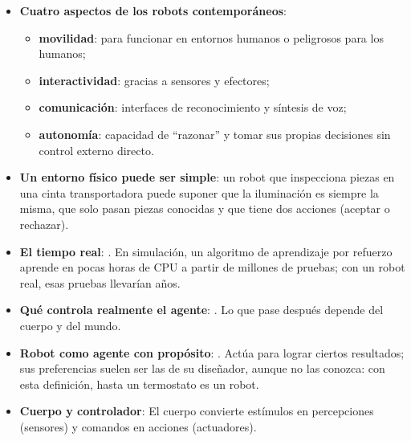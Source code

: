 \documentclass[11pt,a4paper]{article}
\begin{document}
\begin{extras}
\begin{itemize}
  \item \textbf{Cuatro aspectos de los robots contemporáneos}:
  \begin{itemize}
    \item \textbf{movilidad}: para funcionar en entornos humanos o peligrosos para los humanos;
    \item \textbf{interactividad}: gracias a sensores y efectores;
    \item \textbf{comunicación}: interfaces de reconocimiento y síntesis de voz;
    \item \textbf{autonomía}: capacidad de ``razonar'' y tomar sus propias decisiones sin control externo directo.
  \end{itemize}
  \item \textbf{Un entorno físico puede ser simple}: un robot que inspecciona piezas en una cinta transportadora puede suponer que la iluminación es siempre la misma, que solo pasan piezas conocidas y que tiene dos acciones (aceptar o rechazar).
  \item \textbf{El tiempo real}: . En simulación, un algoritmo de aprendizaje por refuerzo aprende en pocas horas de CPU a partir de millones de pruebas; con un robot real, esas pruebas llevarían años.
  \item \textbf{Qué controla realmente el agente}: . Lo que pase después depende del cuerpo y del mundo.
  \item \textbf{Robot como agente con propósito}: . Actúa para lograr ciertos resultados; sus preferencias suelen ser las de su diseñador, aunque no las conozca: con esta definición, hasta un termostato es un robot.
  \item \textbf{Cuerpo y controlador}:  El cuerpo convierte estímulos en percepciones (sensores) y comandos en acciones (actuadores).
\end{itemize}


\end{extras}
\end{document}
